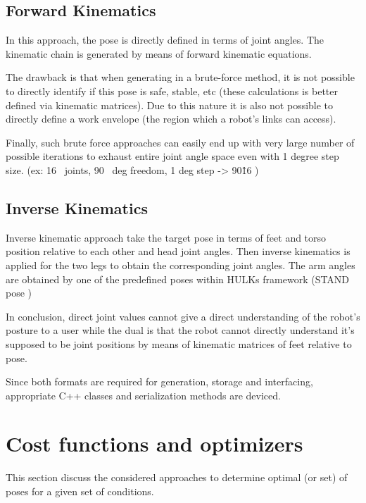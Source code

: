 \documentclass[english, printversion, nomenclature, notitle]{tuvisionthesis} %
\begin{document}
\subsection{Forward Kinematics}

In this approach, the pose is directly defined in terms of joint angles. The kinematic chain is generated by means of forward kinematic equations.

The drawback is that when generating in a brute-force method, it is not possible to directly identify if this pose is safe, stable, etc (these calculations is better defined via kinematic matrices). Due to this nature it is also not possible to directly define a work envelope (the region which a robot's links can access).

Finally, such brute force approaches can easily end up with very large number of possible iterations to exhaust entire joint angle space even with 1 degree step size. (ex: 16~ joints, 90~ deg freedom, 1 deg step -> 90\^16 ) 

\subsection{Inverse Kinematics}

Inverse kinematic approach take the target pose in terms of feet and torso position relative to each other and head joint angles. Then inverse kinematics is applied for the two legs to obtain the corresponding joint angles. The arm angles are obtained by one of the predefined poses within HULKs framework (STAND pose )

In conclusion, direct joint values cannot give a direct understanding of the robot's posture to a user while the dual is that the robot cannot directly understand it's supposed to be joint positions by means of kinematic matrices of feet relative to pose. 

Since both formats are required for generation, storage and interfacing, appropriate C++ classes and serialization methods are deviced.


\section{Cost functions and optimizers}

This section discuss the considered approaches to determine optimal (or set) of poses for a given set of conditions.
\end{document}
